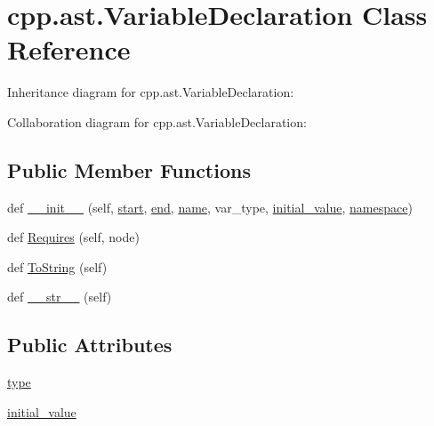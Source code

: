 \hypertarget{classcpp_1_1ast_1_1_variable_declaration}{}\section{cpp.\+ast.\+Variable\+Declaration Class Reference}
\label{classcpp_1_1ast_1_1_variable_declaration}


Inheritance diagram for cpp.\+ast.\+Variable\+Declaration\+:


Collaboration diagram for cpp.\+ast.\+Variable\+Declaration\+:
\subsection*{Public Member Functions}
\begin{DoxyCompactItemize}
\item 
def \hyperlink{classcpp_1_1ast_1_1_variable_declaration_adc19909b6a3b2c2978b02044634fc13f}{\+\_\+\+\_\+init\+\_\+\+\_\+} (self, \hyperlink{classcpp_1_1ast_1_1_node_a7b2aa97e6a049bb1a93aea48c48f1f44}{start}, \hyperlink{classcpp_1_1ast_1_1_node_a3c5e5246ccf619df28eca02e29d69647}{end}, \hyperlink{classcpp_1_1ast_1_1___generic_declaration_af774f4729dfd78d0538a6782fe8514c1}{name}, var\+\_\+type, \hyperlink{classcpp_1_1ast_1_1_variable_declaration_a7c259ca42a06e264679e8ab66e7ea374}{initial\+\_\+value}, \hyperlink{classcpp_1_1ast_1_1___generic_declaration_a8aee3f11b37449d54b42a78e0a689f46}{namespace})
\item 
def \hyperlink{classcpp_1_1ast_1_1_variable_declaration_aaa1cae7cf191e6d561d861cd053a0bf4}{Requires} (self, node)
\item 
def \hyperlink{classcpp_1_1ast_1_1_variable_declaration_a047aa4afddf7b7823a4095cea9477a21}{To\+String} (self)
\item 
def \hyperlink{classcpp_1_1ast_1_1_variable_declaration_a9f5c15731d1bdd8fe14c2a575e2f4fe6}{\+\_\+\+\_\+str\+\_\+\+\_\+} (self)
\end{DoxyCompactItemize}
\subsection*{Public Attributes}
\begin{DoxyCompactItemize}
\item 
\hyperlink{classcpp_1_1ast_1_1_variable_declaration_a8c7cc8578ea12f93c6e1c5c6ef4ddf99}{type}
\item 
\hyperlink{classcpp_1_1ast_1_1_variable_declaration_a7c259ca42a06e264679e8ab66e7ea374}{initial\+\_\+value}
\end{DoxyCompactItemize}


